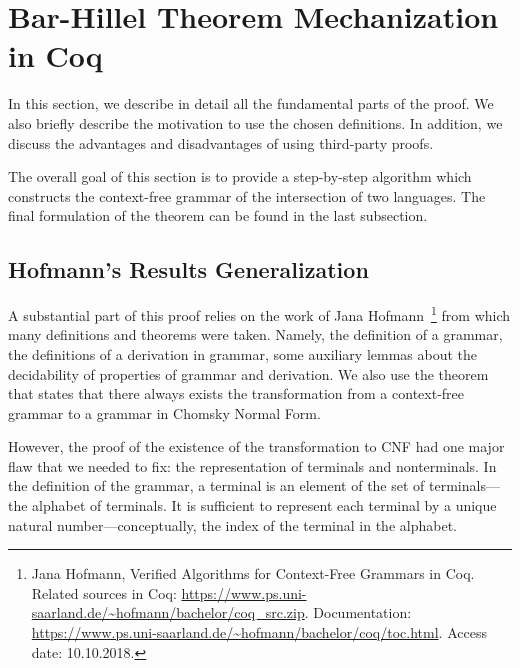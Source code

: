\section{Bar-Hillel Theorem Mechanization in Coq}
\label{sec:main}

In this section, we describe in detail all the fundamental parts of the proof.
We also briefly describe the motivation to use the chosen definitions.
In addition, we discuss the advantages and disadvantages of using third-party proofs.

The overall goal of this section is to provide a step-by-step algorithm which constructs the context-free grammar of the intersection of two languages.
The final formulation of the theorem can be found in the last subsection.

\subsection{ Hofmann's Results Generalization}
\label{sec:solka-generalized}

A substantial part of this proof relies on the work of Jana Hofmann~\cite{smolkaHofmann2016}\footnote{Jana Hofmann, Verified Algorithms for Context-Free Grammars in Coq. Related sources in Coq: \url{https://www.ps.uni-saarland.de/~hofmann/bachelor/coq_src.zip}. Documentation: \url{https://www.ps.uni-saarland.de/~hofmann/bachelor/coq/toc.html}. Access date: 10.10.2018.} from which many definitions and theorems were taken. Namely, the definition of a grammar, the definitions of a derivation in grammar, some auxiliary lemmas about the decidability of properties of grammar and derivation. We also use the theorem that states that there always exists the transformation from a context-free grammar to a grammar in Chomsky Normal Form.

However, the proof of the existence of the transformation to CNF had one major flaw that we needed to fix: the representation of terminals and nonterminals.
In the definition of the grammar, a terminal is an element of the set of terminals---the alphabet of terminals.
It is sufficient to represent each terminal by a unique natural number---conceptually, the index of the terminal in the alphabet.


